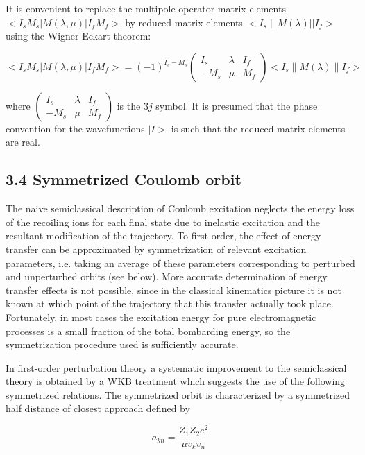 \documentclass[10pt]{article}
\begin{document}
It is convenient to replace the multipole operator matrix elements $<I_{s} M_{s}|M(\lambda, \mu)| I_{f} M_{f}>$ by reduced matrix elements $<I_{s} \| M(\lambda)| | I_{f}>$ using the Wigner-Eckart theorem:

\[
<I_{s} M_{s}|M(\lambda, \mu)| I_{f} M_{f}>=(-1)^{I_{s}-M_{s}}\left(\begin{array}{ccc}
I_{s} & \lambda & I_{f}  \tag{3.17}\\
-M_{s} & \mu & M_{f}
\end{array}\right)<I_{s}\|M(\lambda)\| I_{f}>
\]

where $\left(\begin{array}{ccc}I_{s} & \lambda & I_{f} \\ -M_{s} & \mu & M_{f}\end{array}\right)$ is the $3 j$ symbol. It is presumed that the phase convention for the wavefunctions $\mid I>$ is such that the reduced matrix elements are real.

\subsection*{3.4 Symmetrized Coulomb orbit}
The naive semiclassical description of Coulomb excitation neglects the energy loss of the recoiling ions for each final state due to inelastic excitation and the resultant modification of the trajectory. To first order, the effect of energy transfer can be approximated by symmetrization of relevant excitation parameters, i.e. taking an average of these parameters corresponding to perturbed and unperturbed orbits (see below). More accurate determination of energy transfer effects is not possible, since in the classical kinematics picture it is not known at which point of the trajectory that this transfer actually took place. Fortunately, in most cases the excitation energy for pure electromagnetic processes is a small fraction of the total bombarding energy, so the symmetrization procedure used is sufficiently accurate.

In first-order perturbation theory a systematic improvement to the semiclassical theory is obtained by a WKB treatment which suggests the use of the following symmetrized relations. The symmetrized orbit is characterized by a symmetrized half distance of closest approach defined by


\begin{equation*}
a_{k n}=\frac{Z_{1} Z_{2} e^{2}}{\mu v_{k} v_{n}} \tag{3.18}
\end{equation*}
\end{document}
